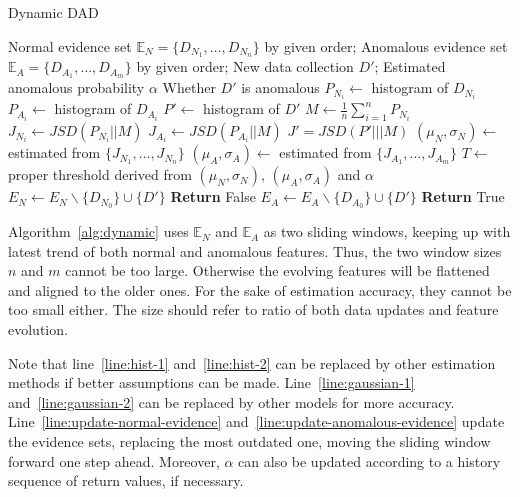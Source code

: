\documentclass[a4paper]{IEEEtran}
\begin{document}
			\begin{algorithm}[!ht]
				\caption{Dynamic DAD}
				\label{alg:dynamic}
				\begin{algorithmic}[1]
					\Require Normal evidence set $\mathbb{E}_N = \{D_{N_1}, \dots, D_{N_n}\}$ by given order; Anomalous evidence set $\mathbb{E}_A = \{D_{A_1}, \dots, D_{A_m}\}$ by given order; New data collection $D'$; Estimated anomalous probability $\alpha$
					\Ensure Whether $D'$ is anomalous
						\State $P_{N_i} \gets$ histogram of $D_{N_i}$\label{line:hist-1}
					\EndFor
						\State $P_{A_i} \gets$ histogram of $D_{A_i}$\label{line:hist-2}
					\EndFor
					\State $P' \gets$ histogram of $D'$
					\State $M \gets \frac{1}{n}\sum_{i=1}^{n}P_{N_i}$
						\State $J_{N_i} \gets JSD(P_{N_i}||M)$
					\EndFor
						\State $J_{A_i} \gets JSD(P_{A_i}||M)$
					\EndFor
					\State $J' = JSD(P'|||M)$
					\State $(\mu_N, \sigma_N) \gets$ estimated from $\{J_{N_1}, \dots, J_{N_n}\}$\label{line:gaussian-1}
					\State $(\mu_A, \sigma_A) \gets$ estimated from $\{J_{A_1}, \dots, J_{A_m}\}$\label{line:gaussian-2}
					\State $T \gets$ proper threshold derived from $(\mu_N, \sigma_N)$, $(\mu_A, \sigma_A)$ and $\alpha$
						\State $E_N \gets E_N \backslash \{D_{N_0}\} \cup \{D'\}$\label{line:update-normal-evidence}
						\State \textbf{Return} False
					\Else
						\State $E_A \gets E_A \backslash \{D_{A_0}\} \cup \{D'\}$\label{line:update-anomalous-evidence}
						\State \textbf{Return} True
					\EndIf
				\end{algorithmic}
			\end{algorithm}
			
			Algorithm~\ref{alg:dynamic} uses $\mathbb{E}_N$ and $\mathbb{E}_A$ as two sliding windows, keeping up with latest trend of both normal and anomalous features. Thus, the two window sizes $n$ and $m$ cannot be too large. Otherwise the evolving features will be flattened and aligned to the older ones. For the sake of estimation accuracy, they cannot be too small either. The size should refer to ratio of both data updates and feature evolution.
			
			Note that line~\ref{line:hist-1} and~\ref{line:hist-2} can be replaced by other estimation methods if better assumptions can be made. Line~\ref{line:gaussian-1} and~\ref{line:gaussian-2} can be replaced by other models for more accuracy. Line~\ref{line:update-normal-evidence} and~\ref{line:update-anomalous-evidence} update the evidence sets, replacing the most outdated one, moving the sliding window forward one step ahead. Moreover, $\alpha$ can also be updated according to a history sequence of return values, if necessary.
	
\end{document}

